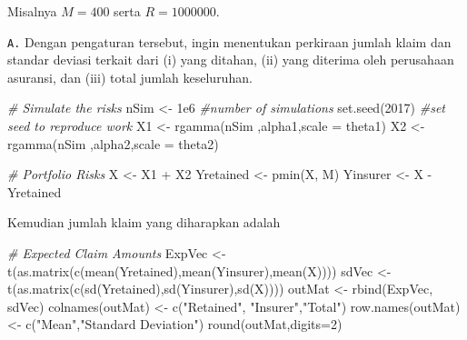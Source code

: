 \documentclass[
]{book}
\newenvironment{Shaded}{\begin{snugshade}}{\end{snugshade}}
\newcommand{\AttributeTok}[1]{\textcolor[rgb]{0.77,0.63,0.00}{#1}}
\newcommand{\CommentTok}[1]{\textcolor[rgb]{0.56,0.35,0.01}{\textit{#1}}}
\newcommand{\DecValTok}[1]{\textcolor[rgb]{0.00,0.00,0.81}{#1}}
\newcommand{\FloatTok}[1]{\textcolor[rgb]{0.00,0.00,0.81}{#1}}
\newcommand{\FunctionTok}[1]{\textcolor[rgb]{0.00,0.00,0.00}{#1}}
\newcommand{\NormalTok}[1]{#1}
\newcommand{\OtherTok}[1]{\textcolor[rgb]{0.56,0.35,0.01}{#1}}
\newcommand{\SpecialCharTok}[1]{\textcolor[rgb]{0.00,0.00,0.00}{#1}}
\newcommand{\StringTok}[1]{\textcolor[rgb]{0.31,0.60,0.02}{#1}}
\begin{document}
Misalnya \(M= 400\) serta \(R = 1000000\).

\texttt{A.} Dengan pengaturan tersebut, ingin menentukan perkiraan jumlah klaim dan standar deviasi terkait dari (i) yang ditahan, (ii) yang diterima oleh perusahaan asuransi, dan (iii) total jumlah keseluruhan.

\begin{Shaded}
\begin{Highlighting}[]
\CommentTok{\# Simulate the risks}
\NormalTok{nSim }\OtherTok{\textless{}{-}} \FloatTok{1e6}  \CommentTok{\#number of simulations}
\FunctionTok{set.seed}\NormalTok{(}\DecValTok{2017}\NormalTok{) }\CommentTok{\#set seed to reproduce work }
\NormalTok{X1 }\OtherTok{\textless{}{-}} \FunctionTok{rgamma}\NormalTok{(nSim ,alpha1,}\AttributeTok{scale =}\NormalTok{ theta1)  }
\NormalTok{X2 }\OtherTok{\textless{}{-}} \FunctionTok{rgamma}\NormalTok{(nSim ,alpha2,}\AttributeTok{scale =}\NormalTok{ theta2) }

\CommentTok{\# Portfolio Risks}
\NormalTok{X         }\OtherTok{\textless{}{-}}\NormalTok{ X1 }\SpecialCharTok{+}\NormalTok{ X2 }
\NormalTok{Yretained }\OtherTok{\textless{}{-}} \FunctionTok{pmin}\NormalTok{(X, M)}
\NormalTok{Yinsurer  }\OtherTok{\textless{}{-}}\NormalTok{ X }\SpecialCharTok{{-}}\NormalTok{ Yretained}
\end{Highlighting}
\end{Shaded}

Kemudian jumlah klaim yang diharapkan adalah

\begin{Shaded}
\begin{Highlighting}[]
\CommentTok{\# Expected Claim Amounts}
\NormalTok{ExpVec }\OtherTok{\textless{}{-}} \FunctionTok{t}\NormalTok{(}\FunctionTok{as.matrix}\NormalTok{(}\FunctionTok{c}\NormalTok{(}\FunctionTok{mean}\NormalTok{(Yretained),}\FunctionTok{mean}\NormalTok{(Yinsurer),}\FunctionTok{mean}\NormalTok{(X))))}
\NormalTok{sdVec }\OtherTok{\textless{}{-}} \FunctionTok{t}\NormalTok{(}\FunctionTok{as.matrix}\NormalTok{(}\FunctionTok{c}\NormalTok{(}\FunctionTok{sd}\NormalTok{(Yretained),}\FunctionTok{sd}\NormalTok{(Yinsurer),}\FunctionTok{sd}\NormalTok{(X))))}
\NormalTok{outMat }\OtherTok{\textless{}{-}} \FunctionTok{rbind}\NormalTok{(ExpVec, sdVec)}
\FunctionTok{colnames}\NormalTok{(outMat) }\OtherTok{\textless{}{-}} \FunctionTok{c}\NormalTok{(}\StringTok{"Retained"}\NormalTok{, }\StringTok{"Insurer"}\NormalTok{,}\StringTok{"Total"}\NormalTok{)}
\FunctionTok{row.names}\NormalTok{(outMat) }\OtherTok{\textless{}{-}} \FunctionTok{c}\NormalTok{(}\StringTok{"Mean"}\NormalTok{,}\StringTok{"Standard Deviation"}\NormalTok{)}
\FunctionTok{round}\NormalTok{(outMat,}\AttributeTok{digits=}\DecValTok{2}\NormalTok{)}
\end{Highlighting}
\end{Shaded}
\end{document}
